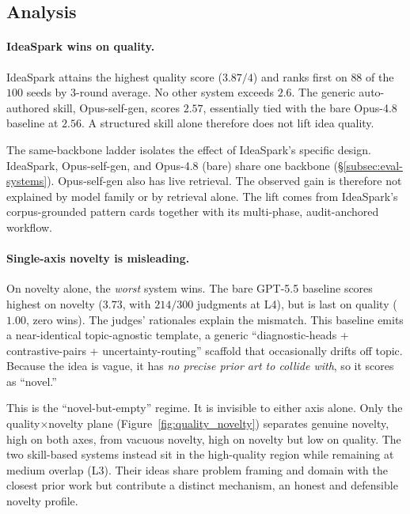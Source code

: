 \documentclass[10pt,a4paper]{article}
\begin{document}
\subsection{Analysis}
\label{subsec:eval-analysis}

\paragraph{IdeaSpark wins on quality.} IdeaSpark attains the highest quality score ($3.87/4$) and ranks first on $88$ of the $100$ seeds by 3-round average. No other system exceeds $2.6$. The generic auto-authored skill, Opus-self-gen, scores $2.57$, essentially tied with the bare Opus-4.8 baseline at $2.56$. A structured skill alone therefore does not lift idea quality.

The same-backbone ladder isolates the effect of IdeaSpark's specific design. IdeaSpark, Opus-self-gen, and Opus-4.8 (bare) share one backbone (\S\ref{subsec:eval-systems}). Opus-self-gen also has live retrieval. The observed gain is therefore not explained by model family or by retrieval alone. The lift comes from IdeaSpark's corpus-grounded pattern cards together with its multi-phase, audit-anchored workflow.

\paragraph{Single-axis novelty is misleading.} On novelty alone, the \emph{worst} system wins. The bare GPT-5.5 baseline scores highest on novelty ($3.73$, with $214/300$ judgments at L4), but is last on quality ($1.00$, zero wins). The judges' rationales explain the mismatch. This baseline emits a near-identical topic-agnostic template, a generic ``diagnostic-heads + contrastive-pairs + uncertainty-routing'' scaffold that occasionally drifts off topic. Because the idea is vague, it has \emph{no precise prior art to collide with}, so it scores as ``novel.''

This is the ``novel-but-empty'' regime. It is invisible to either axis alone. Only the quality$\times$novelty plane (Figure~\ref{fig:quality_novelty}) separates genuine novelty, high on both axes, from vacuous novelty, high on novelty but low on quality. The two skill-based systems instead sit in the high-quality region while remaining at medium overlap (L3). Their ideas share problem framing and domain with the closest prior work but contribute a distinct mechanism, an honest and defensible novelty profile.
\end{document}
